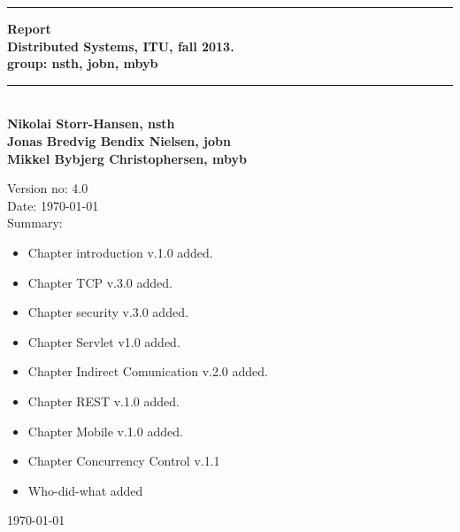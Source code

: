 \begin{titlepage}
\begin{center}
\rule{430pt}{3pt}
 {\huge\bfseries Report\\ }
 {\normalsize\bfseries Distributed Systems, ITU, fall 2013.\\ group: nsth, jobn, mbyb} 
  
 \rule{430pt}{3pt}\\[1cm]
 
 {\normalsize\bfseries Nikolai Storr-Hansen, nsth} \\
 {\normalsize\bfseries Jonas Bredvig Bendix Nielsen, jobn} \\
 {\normalsize\bfseries Mikkel Bybjerg Christophersen, mbyb} \\

 \vspace{2cm}
\end{center}


Version no: 4.0 \\

Date: \today \\

Summary: \\
 
\begin{itemize}

\item Chapter introduction v.1.0 added.

\item Chapter TCP v.3.0 added.

\item Chapter security v.3.0 added.

\item Chapter Servlet v1.0 added. 

\item Chapter Indirect Comunication v.2.0 added.

\item Chapter REST v.1.0 added.

\item Chapter Mobile v.1.0 added.

\item Chapter Concurrency Control v.1.1

\item Who-did-what added
\end{itemize}


\begin{center}

 \vfill
\textsl{}
 \vfill
{\today}
\end{center}
\end{titlepage}